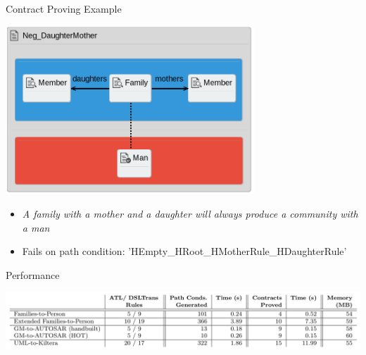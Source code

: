 \documentclass[xcolor=dvipsnames, 12pt, handout]{beamer}
\begin{document}
\begin{frame}{Contract Proving Example}
\begin{center}
\includegraphics[width=0.7\textwidth]{figures/Pos_DaughterMother}
\end{center}
\begin{itemize}[<+->]
\item \textit{A family with a mother and a daughter will always produce a community with a man}
\item Fails on path condition: 'HEmpty\_HRoot\_HMotherRule\_HDaughterRule'
\end{itemize}
\end{frame}

\begin{frame}{Performance}
\begin{center}
\includegraphics[width=\textwidth]{figures/performance}
\end{center}
\end{frame}
\end{document}
